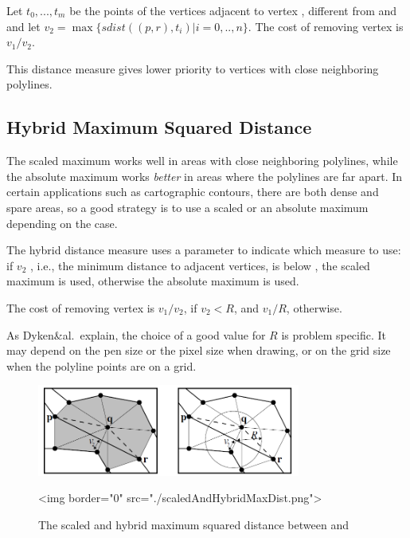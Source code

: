 Let $t_0,...,t_m$ be the points of the vertices adjacent to vertex , different from  and  and let $ v_2 = \max \{ sdist((p,r), t_i) | i=0,..,n\}$. The cost of removing vertex  is $v_1/v_2$.

This distance measure gives lower priority to vertices with close neighboring polylines.

\subsection{Hybrid Maximum Squared Distance}

The scaled maximum works well in areas with close neighboring polylines, while the absolute maximum works {\em better}
in areas where the polylines are far apart. In certain applications such as cartographic contours, there are both dense
and spare areas, so a good strategy is to use a scaled or an absolute maximum depending on the case.

The hybrid distance measure uses a parameter  to indicate which measure to use: if $v_2$ , i.e., the minimum distance to adjacent vertices,
is below , the scaled maximum is used, otherwise the absolute maximum is used.

The cost of removing vertex  is  $v_1/v_2$, if $v_2 <R$, and $v_1/R$, otherwise.

As Dyken\&al.\ explain, the choice of a good value for $R$ is problem
specific.  It may depend on the pen size or the pixel size when
drawing, or on the grid size when the polyline points are on a grid.

\begin{figure}[ht]
\begin{center}
 \begin{ccTexOnly}
   \includegraphics[height=3cm]{Polyline_simplification_2/scaledAndHybridMaxDist.png}
 \end{ccTexOnly}
 \begin{ccHtmlOnly}
   <img border="0" src="./scaledAndHybridMaxDist.png">
 \end{ccHtmlOnly}
   \label{figure:scaledAndHybrid}
\end{center}
\caption{The scaled and hybrid maximum squared distance between  and }
\end{figure}

